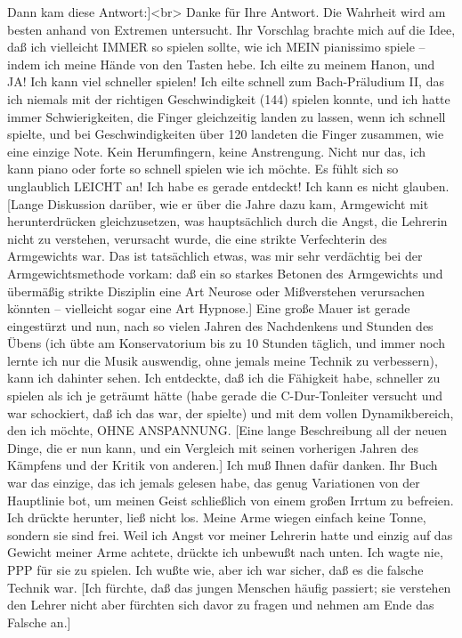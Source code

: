 Dann kam diese Antwort:]<br>
Danke für Ihre Antwort.
Die Wahrheit wird am besten anhand von Extremen untersucht.
Ihr Vorschlag brachte mich auf die Idee, daß ich vielleicht IMMER so spielen sollte, wie ich MEIN pianissimo spiele -- indem ich meine Hände von den Tasten hebe.
Ich eilte zu meinem Hanon, und JA!
Ich kann viel schneller spielen!
Ich eilte schnell zum Bach-Präludium II, das ich niemals mit der richtigen Geschwindigkeit (144) spielen konnte, und ich hatte immer Schwierigkeiten, die Finger gleichzeitig landen zu lassen, wenn ich schnell spielte, und bei Geschwindigkeiten über 120 landeten die Finger zusammen, wie eine einzige Note.
Kein Herumfingern, keine Anstrengung.
Nicht nur das, ich kann piano oder forte so schnell spielen wie ich möchte.
Es fühlt sich so unglaublich LEICHT an!
Ich habe es gerade entdeckt!
Ich kann es nicht glauben.
[Lange Diskussion darüber, wie er über die Jahre dazu kam, Armgewicht mit herunterdrücken gleichzusetzen, was hauptsächlich durch die Angst, die Lehrerin nicht zu verstehen, verursacht wurde, die eine strikte Verfechterin des Armgewichts war.
Das ist tatsächlich etwas, was mir sehr verdächtig bei der Armgewichtsmethode vorkam: daß ein so starkes Betonen des Armgewichts und übermäßig strikte Disziplin eine Art Neurose oder Mißverstehen verursachen könnten -- vielleicht sogar eine Art Hypnose.]
Eine große Mauer ist gerade eingestürzt und nun, nach so vielen Jahren des Nachdenkens und Stunden des Übens (ich übte am Konservatorium bis zu 10 Stunden täglich, und immer noch lernte ich nur die Musik auswendig, ohne jemals meine Technik zu verbessern), kann ich dahinter sehen.
Ich entdeckte, daß ich die Fähigkeit habe, schneller zu spielen als ich je geträumt hätte (habe gerade die C-Dur-Tonleiter versucht und war schockiert, daß ich das war, der spielte) und mit dem vollen Dynamikbereich, den ich möchte, OHNE ANSPANNUNG.
[Eine lange Beschreibung all der neuen Dinge, die er nun kann, und ein Vergleich mit seinen vorherigen Jahren des Kämpfens und der Kritik von anderen.]
Ich muß Ihnen dafür danken.
Ihr Buch war das einzige, das ich jemals gelesen habe, das genug Variationen von der Hauptlinie bot, um meinen Geist schließlich von einem großen Irrtum zu befreien.
Ich drückte herunter, ließ nicht los.
Meine Arme wiegen einfach keine Tonne, sondern sie sind frei.
Weil ich Angst vor meiner Lehrerin hatte und einzig auf das Gewicht meiner Arme achtete, drückte ich unbewußt nach unten.
Ich wagte nie, PPP für sie zu spielen.
Ich wußte wie, aber ich war sicher, daß es die falsche Technik war.
[Ich fürchte, daß das jungen Menschen häufig passiert; sie verstehen den Lehrer nicht aber fürchten sich davor zu fragen und nehmen am Ende das Falsche an.]
